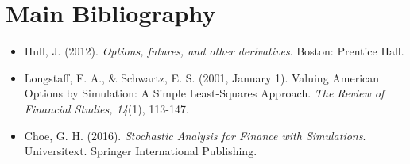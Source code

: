 \documentclass[a4paper,prd,nofootinbib,superscriptaddress,floatfix]{revtex4}
\begin{document}
\section{Main Bibliography}
\begin{itemize}
\item Hull, J. (2012). \textit{Options, futures, and other derivatives}. Boston: Prentice Hall.

\item Longstaff, F. A., \& Schwartz, E. S. (2001, January 1). Valuing American Options by Simulation: A Simple Least-Squares Approach. \textit{The Review of Financial Studies, 14}(1), 113-147.

\item Choe, G. H. (2016). \textit{Stochastic Analysis for Finance with Simulations}. Universitext. Springer International Publishing. 
\end{itemize}
\end{document}
